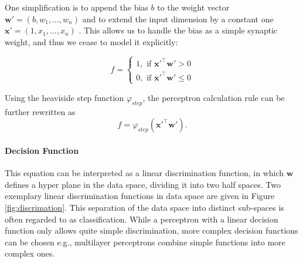 One simplification is to append the bias $b$ to the weight vector $\textbf{w}' = (b , w_1, ... , w_n)$ and to extend the input dimension by a constant one $\textbf{x}' = (1, x_1 , ... , x_n)$ .
This allows us to handle the bias as a simple synaptic weight, and thus we cease to model it explicitly:

\[
	f = 
		\begin{cases}
			1, \text{  if  } \textbf{x}'^\intercal \textbf{w}'> 0  \\
			0, \text{  if  } \textbf{x}'^\intercal \textbf{w}' \le 0
		\end{cases}	
\]



Using the heaviside step function $\varphi_{step}$, the perceptron calculation rule can be further rewritten as 
\[
	f = \varphi_{step}(\textbf{x}'^\intercal \textbf{w}') .
\]   

\paragraph{Decision Function} \label{c:perdecision}

This equation can be interpreted as a linear discrimination function, in which $\textbf{w}$ defines a hyper plane in the data space, dividing it into two half spaces. 
Two exemplary linear discrimination functions in data space are given in Figure \ref{fig:discrimation}.
This separation of the data space into distinct sub-spaces is often regarded to as classification. 
While a perceptron with a linear decision function only allows quite simple discrimination, more complex decision functions can be chosen e.g., multilayer perceptrons combine simple functions into more complex ones. 

